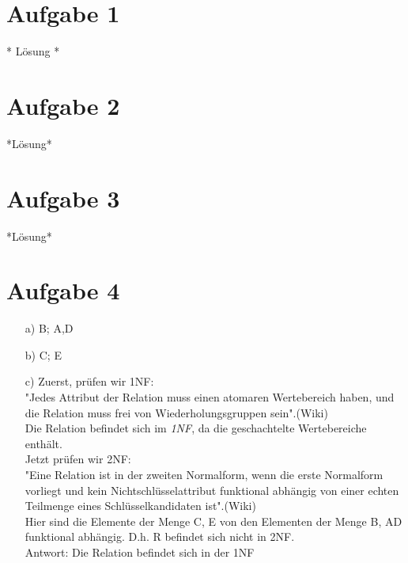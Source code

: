 \documentclass[a4paper,12pt]{scrartcl}
\begin{document}
\section{Aufgabe 1}
* L\"osung *

\section{Aufgabe 2}
*L\"osung*

\section{Aufgabe 3} 	
*L\"osung*

\section{Aufgabe 4} 	
\begin{enumerate}
\item[a)] {B}; {A,D}

\item[b)] {C}; {E}

\item[c)]
Zuerst, prüfen wir 1NF:\\
"Jedes Attribut der Relation muss einen atomaren Wertebereich haben, und die Relation muss frei von Wiederholungsgruppen sein".(Wiki)\\
Die Relation befindet sich im {\itshape \large 1NF}, da die geschachtelte Wertebereiche enthält.\\

Jetzt prüfen wir 2NF:\\
"Eine Relation ist in der zweiten Normalform, wenn die erste Normalform vorliegt und kein Nichtschlüsselattribut funktional abhängig von einer echten Teilmenge eines Schlüsselkandidaten ist".(Wiki)\\
Hier sind die Elemente der Menge {C, E} von den Elementen der Menge {B, AD} funktional abhängig. D.h. R befindet sich nicht in 2NF.\\ 
Antwort: Die Relation befindet sich in der 1NF

\end{enumerate}
\end{document}
